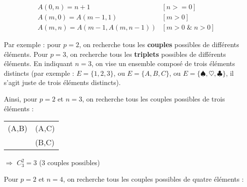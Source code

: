 \documentclass[11pt,a4paper]{article}
\begin{document}

\bigskip


\begin{equation*}
  \begin{aligned}
& A(0, n) = n + 1                 &  [n >= 0] & \\
& A(m, 0) = A(m - 1, 1)           &  [m > 0]  & \\
& A(m, n) = A(m - 1, A(m, n - 1)) &  [m > 0 \; \& \; n > 0] &
  \end{aligned}
\end{equation*}

\bigskip


\bigskip

Par exemple : pour $ p = 2 $, on recherche tous les \textbf{couples} possibles de différents éléments.
Pour $ p = 3 $, on recherche tous les \textbf{triplets} possibles de différents éléments.
En indiquant $ n = 3 $, on vise un ensemble composé de trois éléments distincts (par exemple : $ E = \{ 1, 2, 3 \} $, ou $ E = \{ A, B, C \} $, ou $ E = \{ \spadesuit, \heartsuit, \clubsuit \} $, il s'agit juste de trois éléments distincts).

\newpage

Ainsi, pour $ p = 2 $ et $ n = 3 $, on recherche tous les couples possibles de trois éléments :

\begin{table}[!ht]
  \centering
  \begin{tabular}{l l}
(A,B) & (A,C) \\
      & (B,C)
  \end{tabular}
\end{table}

\hspace*{3cm} $\Rightarrow$ $ C^{2}_{3} = 3 $ \hspace*{1cm} (3 couples possibles)

\bigskip

Pour $ p = 2 $ et $ n = 4 $, on recherche tous les couples possibles de quatre éléments :
\end{document}
